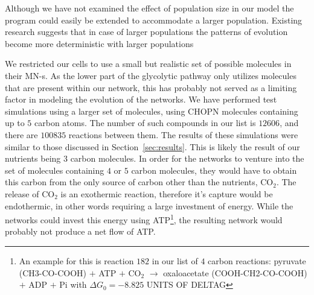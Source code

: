 \documentclass[a4paper,12pt]{article}
\begin{document}
Although we have not examined the effect of population size in our model the program could easily be extended to accommodate a larger population. Existing research suggests that in case of larger populations the patterns of evolution become more deterministic with larger populations \cite{predictability}


We restricted our cells to use a small but realistic set of possible molecules in their MN-s. As the lower part of the glycolytic pathway only utilizes molecules that are present within our network, this has probably not served as a limiting factor in modeling the evolution of the networks. We have performed test simulations using a larger set of molecules, using CHOPN molecules containing up to $5$ carbon atoms. The number of such compounds in our list is $12606$, and there are $100 835$ reactions between them. The results of these simulations were similar to those discussed in Section~\ref{sec:results}. This is likely the result of our nutrients being $3$ carbon molecules. In order for the networks to venture into the set of molecules containing $4$ or $5$ carbon molecules, they would have to obtain this carbon from the only source of carbon other than the nutrients,  CO$_2$. The release of CO$_2$ is an exothermic reaction, therefore it's capture would be endothermic, in other words requiring a large investment of energy. While the networks could invest this energy using ATP\footnote{ An example for this is reaction $182$ in our list of $4$ carbon reactions: pyruvate (CH3-CO-COOH) $+$ ATP $+$ CO$_2$ $\rightarrow$   oxaloacetate (COOH-CH2-CO-COOH) $+$ ADP $+$ Pi with $\Delta G_0=-8.825$ UNITS OF DELTAG}, the resulting network would probably not produce a net flow of ATP. 
\end{document}
